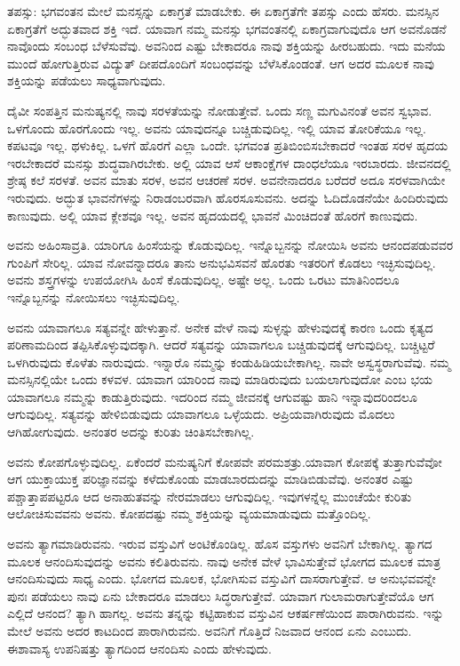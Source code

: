 ತಪಸ್ಸು: ಭಗವಂತನ ಮೇಲೆ ಮನಸ್ಸನ್ನು ಏಕಾಗ್ರತೆ ಮಾಡಬೇಕು. ಈ ಏಕಾಗ್ರತೆಗೇ ತಪಸ್ಸು ಎಂದು ಹೆಸರು. ಮನಸ್ಸಿನ ಏಕಾಗ್ರತೆಗೆ ಅದ್ಭುತವಾದ ಶಕ್ತಿ ಇದೆ. ಯಾವಾಗ ನಮ್ಮ ಮನಸ್ಸು ಭಗವಂತನಲ್ಲಿ ಏಕಾಗ್ರವಾಗುವುದೊ ಆಗ ಅವನೊಡನೆ ನಾವೊಂದು ಸಂಬಂಧ ಬೆಳೆಸುವೆವು. ಅವನಿಂದ ಎಷ್ಟು ಬೇಕಾದರೂ ನಾವು ಶಕ್ತಿಯನ್ನು ಹೀರಬಹುದು. ಇದು ಮನೆಯ ಮುಂದೆ ಹೋಗುತ್ತಿರುವ ವಿದ್ಯುತ್ ದೀಪದೊಂದಿಗೆ ಸಂಬಂಧವನ್ನು ಬೆಳೆಸಿಕೊಂಡಂತೆ. ಆಗ ಅದರ ಮೂಲಕ ನಾವು ಶಕ್ತಿಯನ್ನು ಪಡೆಯಲು ಸಾಧ್ಯವಾಗುವುದು.

ದೈವೀ ಸಂಪತ್ತಿನ ಮನುಷ್ಯನಲ್ಲಿ ನಾವು ಸರಳತೆಯನ್ನು ನೋಡುತ್ತೇವೆ. ಒಂದು ಸಣ್ಣ ಮಗುವಿನಂತೆ ಅವನ ಸ್ವಭಾವ. ಒಳಗೊಂದು ಹೊರಗೊಂದು ಇಲ್ಲ. ಅವನು ಯಾವುದನ್ನೂ ಬಚ್ಚಿಡುವುದಿಲ್ಲ. ಇಲ್ಲಿ ಯಾವ ತೋರಿಕೆಯೂ ಇಲ್ಲ. ಕಪಟವೂ ಇಲ್ಲ. ಥಳುಕಿಲ್ಲ. ಒಳಗೆ ಹೊರಗೆ ಎಲ್ಲಾ ಒಂದೇ. ಭಗವಂತ ಪ್ರತಿಬಿಂಬಿಸಬೇಕಾದರೆ ಇಂತಹ ಸರಳ ಹೃದಯ ಇರಬೇಕಾದರೆ ಮನಸ್ಸು ಶುದ್ಧವಾಗಿರಬೇಕು. ಅಲ್ಲಿ ಯಾವ ಆಸೆ ಆಕಾಂಕ್ಷೆಗಳ ದಾಂಧಲೆಯೂ ಇರಬಾರದು. ಜೀವನದಲ್ಲಿ ಶ್ರೇಷ್ಠ ಕಲೆ ಸರಳತೆ. ಅವನ ಮಾತು ಸರಳ, ಅವನ ಆಚರಣೆ ಸರಳ. ಅವನೇನಾದರೂ ಬರೆದರೆ ಅದೂ ಸರಳವಾಗಿಯೇ ಇರುವುದು. ಅದ್ಭುತ ಭಾವನೆಗಳನ್ನು ನಿರಾಡಂಬರವಾಗಿ ಹೊರಸೂಸುವನು. ಅದನ್ನು ಓದಿದೊಡನೆಯೇ ಹಿಂದಿರುವುದು ಕಾಣುವುದು. ಅಲ್ಲಿ ಯಾವ ಕ್ಲೇಶವೂ ಇಲ್ಲ. ಅವನ ಹೃದಯದಲ್ಲಿ ಭಾವನೆ ಮಿಂಚಿದಂತೆ ಹೊರಗೆ ಕಾಣುವುದು.

ಅವನು ಅಹಿಂಸಾವ್ರತಿ. ಯಾರಿಗೂ ಹಿಂಸೆಯನ್ನು ಕೊಡುವುದಿಲ್ಲ. ಇನ್ನೊಬ್ಬನನ್ನು ನೋಯಿಸಿ ಅವನು ಆನಂದಪಡುವವರ ಗುಂಪಿಗೆ ಸೇರಿಲ್ಲ. ಯಾವ ನೋವನ್ನಾದರೂ ತಾನು ಅನುಭವಿಸವನೆ ಹೊರತು ಇತರರಿಗೆ ಕೊಡಲು ಇಚ್ಛಿಸುವುದಿಲ್ಲ. ಅವನು ಶಸ್ತ್ರಗಳನ್ನು ಉಪಯೋಗಿಸಿ ಹಿಂಸೆ ಕೊಡುವುದಿಲ್ಲ. ಅಷ್ಟೇ ಅಲ್ಲ. ಒಂದು ಒರಟು ಮಾತಿನಿಂದಲೂ ಇನ್ನೊಬ್ಬನನ್ನು ನೋಯಿಸಲು ಇಚ್ಛಿಸುವುದಿಲ್ಲ.

ಅವನು ಯಾವಾಗಲೂ ಸತ್ಯವನ್ನೇ ಹೇಳುತ್ತಾನೆ. ಅನೇಕ ವೇಳೆ ನಾವು ಸುಳ್ಳನ್ನು ಹೇಳುವುದಕ್ಕೆ ಕಾರಣ ಒಂದು ಕೃತ್ಯದ ಪರಿಣಾಮದಿಂದ ತಪ್ಪಿಸಿಕೊಳ್ಳುವುದಕ್ಕಾಗಿ. ಆದರೆ ಸತ್ಯವನ್ನು ಯಾವಾಗಲೂ ಬಚ್ಚಿಡುವುದಕ್ಕೆ ಆಗುವುದಿಲ್ಲ. ಬಚ್ಚಿಟ್ಟರೆ ಒಳಗಿರುವುದು ಕೊಳೆತು ನಾರುವುದು. ಇನ್ನಾರೊ ನಮ್ಮನ್ನು ಕಂಡುಹಿಡಿಯಬೇಕಾಗಿಲ್ಲ. ನಾವೇ ಅಸ್ವಸ್ಥರಾಗುವೆವು. ನಮ್ಮ ಮನಸ್ಸಿನಲ್ಲಿಯೇ ಒಂದು ಕಳವಳ. ಯಾವಾಗ ಯಾರಿಂದ ನಾವು ಮಾಡಿರುವುದು ಬಯಲಾಗುವುದೋ ಎಂಬ ಭಯ ಯಾವಾಗಲೂ ನಮ್ಮನ್ನು ಕಾಡುತ್ತಿರುವುದು. ಇದರಿಂದ ನಮ್ಮ ಜೀವನಕ್ಕೆ ಆಗುವಷ್ಟು ಹಾನಿ ಇನ್ನಾವುದರಿಂದಲೂ ಆಗುವುದಿಲ್ಲ. ಸತ್ಯವನ್ನು ಹೇಳಿಬಿಡುವುದು ಯಾವಾಗಲೂ ಒಳ್ಳೆಯದು. ಅಪ್ರಿಯವಾಗಿರುವುದು ಮೊದಲು ಆಗಿಹೋಗುವುದು. ಅನಂತರ ಅದನ್ನು ಕುರಿತು ಚಿಂತಿಸ\-ಬೇಕಾಗಿಲ್ಲ.

ಅವನು ಕೋಪಗೊಳ್ಳುವುದಿಲ್ಲ. ಏಕೆಂದರೆ ಮನುಷ್ಯನಿಗೆ ಕೋಪವೇ ಪರಮಶತ್ರು.\break ಯಾವಾಗ ಕೋಪಕ್ಕೆ ತುತ್ತಾಗುವೆವೋ ಆಗ ಯುಕ್ತಾಯುಕ್ತ ಪರಿಜ್ಞಾನವನ್ನು ಕಳೆದುಕೊಂಡು ಮಾಡ\-ಬಾರದುದನ್ನು ಮಾಡಿಬಿಡುವೆವು. ಅನಂತರ ಎಷ್ಟು ಪಶ್ಚಾತ್ತಾಪಪಟ್ಟರೂ ಆದ ಅನಾಹುತವನ್ನು ನೇರಮಾಡಲು ಆಗುವುದಿಲ್ಲ. ಇವುಗಳನ್ನೆಲ್ಲ ಮುಂಚೆಯೇ ಕುರಿತು ಆಲೋಚಿಸುವವನು ಅವನು. ಕೋಪದಷ್ಟು ನಮ್ಮ ಶಕ್ತಿಯನ್ನು ವ್ಯಯಮಾಡುವುದು ಮತ್ತೊಂದಿಲ್ಲ.

ಅವನು ತ್ಯಾಗಮಾಡಿರುವನು. ಇರುವ ವಸ್ತುವಿಗೆ ಅಂಟಿಕೊಂಡಿಲ್ಲ. ಹೊಸ ವಸ್ತುಗಳು ಅವನಿಗೆ ಬೇಕಾಗಿಲ್ಲ. ತ್ಯಾಗದ ಮೂಲಕ ಆನಂದಿಸುವುದನ್ನು ಅವನು ಕಲಿತಿರುವನು. ನಾವು ಅನೇಕ ವೇಳೆ ಭಾವಿಸುತ್ತೇವೆ ಭೋಗದ ಮೂಲಕ ಮಾತ್ರ ಆನಂದಿಸುವುದು ಸಾಧ್ಯ ಎಂದು. ಭೋಗದ ಮೂಲಕ, ಭೋಗಿಸುವ ವಸ್ತುವಿಗೆ ದಾಸರಾಗುತ್ತೇವೆ. ಆ ಅನುಭವವನ್ನೇ ಪುನಃ ಪಡೆಯಲು ನಾವು ಏನು ಬೇಕಾದರೂ ಮಾಡಲು ಸಿದ್ಧರಾಗುತ್ತೇವೆ. ಯಾವಾಗ ಗುಲಾಮರಾಗುತ್ತೇವೆಯೊ ಆಗ ಎಲ್ಲಿದೆ ಆನಂದ? ತ್ಯಾಗಿ ಹಾಗಲ್ಲ. ಅವನು ತನ್ನನ್ನು ಕಟ್ಟಿಹಾಕುವ ವಸ್ತುವಿನ ಆಕರ್ಷಣೆಯಿಂದ ಪಾರಾಗಿರುವನು. ಇನ್ನು ಮೇಲೆ ಅವನು ಅದರ ಕಾಟದಿಂದ ಪಾರಾಗಿರುವನು. ಅವನಿಗೆ ಗೊತ್ತಿದೆ ನಿಜವಾದ ಆನಂದ ಏನು ಎಂಬುದು. ಈಶಾವಾಸ್ಯ ಉಪನಿಷತ್ತು ತ್ಯಾಗದಿಂದ ಆನಂದಿಸು ಎಂದು ಹೇಳುವುದು.

